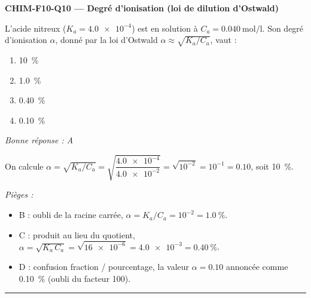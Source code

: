\documentclass[11pt,a4paper]{article}
\begin{document}
\noindent\textbf{CHIM-F10-Q10 --- Degré d'ionisation (loi de dilution d'Ostwald)}\par
L'acide nitreux  ($K_a = \num{4.0e-4}$) est en solution à $C_a = \qty{0.040}{\mol\per\litre}$. Son degré d'ionisation $\alpha$, donné par la loi d'Ostwald $\alpha \approx \sqrt{K_a/C_a}$, vaut :
\begin{enumerate}[label=\Alph*)]
\item \qty{10}{\percent}
\item \qty{1.0}{\percent}
\item \qty{0.40}{\percent}
\item \qty{0.10}{\percent}
\end{enumerate}
\textit{Bonne réponse : A}\par
On calcule $\alpha = \sqrt{K_a/C_a} = \sqrt{\dfrac{\num{4.0e-4}}{\num{4.0e-2}}} = \sqrt{10^{-2}} = 10^{-1} = \num{0.10}$, soit \qty{10}{\percent}.\par
\textit{Pièges :}
\begin{itemize}
\item B : oubli de la racine carrée, $\alpha = K_a/C_a = 10^{-2} = \qty{1.0}{\percent}$.
\item C : produit au lieu du quotient, $\alpha = \sqrt{K_a\,C_a} = \sqrt{\num{16e-6}} = \num{4.0e-3} = \qty{0.40}{\percent}$.
\item D : confusion fraction / pourcentage, la valeur $\alpha = \num{0.10}$ annoncée comme \qty{0.10}{\percent} (oubli du facteur 100).
\end{itemize}
\vspace{6pt}\hrule
\end{document}
